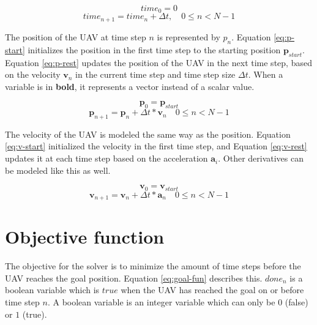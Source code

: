 \begin{equation}
\label{eq:t-start}
time_0 = 0
\end{equation}
\begin{equation}
\label{eq:t-rest}
time_{n+1} = time_{n} + \Delta t,  \quad 0 \leq n < N - 1
\end{equation}

The position of the UAV at time step $n$ is represented by $p_n$. Equation \ref{eq:p-start} initializes the position in the first time step to the starting position $\boldsymbol{p}_{start}$. Equation \ref{eq:p-rest} updates the position of the UAV in the next time step, based on the velocity $\boldsymbol{v}_n$ in the current time step and time step size $\Delta t$. When a variable is in \textbf{bold}, it represents a vector instead of a scalar value.

\begin{equation}
\label{eq:p-start}
\boldsymbol{p}_0 = \boldsymbol{p}_{start}
\end{equation}
\begin{equation}
\label{eq:p-rest}
\boldsymbol{p}_{n+1} = \boldsymbol{p}_{n} + \Delta t * \boldsymbol{v}_{n}  \quad 0 \leq n < N - 1
\end{equation}

The velocity of the UAV is modeled the same way as the position. Equation \ref{eq:v-start} initialized the velocity in the first time step, and Equation \ref{eq:v-rest} updates it at each time step based on the acceleration $\boldsymbol{a}_i$. Other derivatives can be modeled like this as well.

\begin{equation}
\label{eq:v-start}
\boldsymbol{v}_0 =\boldsymbol{v}_{start}
\end{equation}
\begin{equation}
\label{eq:v-rest}
\boldsymbol{v}_{n+1} =\boldsymbol{v}_{n} + \Delta t * \boldsymbol{a}_{n}  \quad 0 \leq n < N - 1
\end{equation}

\section{Objective function}
\label{subsec:obj-fun}
The objective for the solver is to minimize the amount of time steps before the UAV reaches the goal position. Equation \ref{eq:goal-fun} describes this. $done_n$ is a boolean variable which is $true$ when the UAV has reached the goal on or before time step $n$. A boolean variable is an integer variable which can only be $0$ (false) or $1$ (true).


